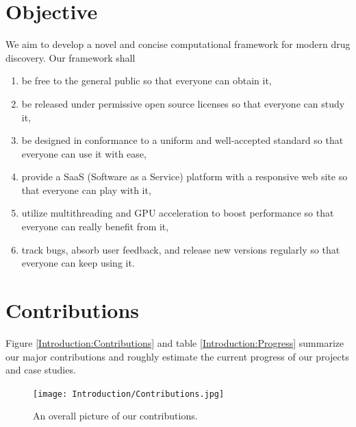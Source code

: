 \section{Objective}

We aim to develop a novel and concise computational framework for modern drug discovery. Our framework shall
\begin{enumerate}
\item be free to the general public so that everyone can obtain it,
\item be released under permissive open source licenses so that everyone can study it,
\item be designed in conformance to a uniform and well-accepted standard so that everyone can use it with ease,
\item provide a SaaS (Software as a Service) platform with a responsive web site so that everyone can play with it,
\item utilize multithreading and GPU acceleration to boost performance so that everyone can really benefit from it,
\item track bugs, absorb user feedback, and release new versions regularly so that everyone can keep using it.
\end{enumerate}

\section{Contributions}

Figure \ref{Introduction:Contributions} and table \ref{Introduction:Progress} summarize our major contributions and roughly estimate the current progress of our projects and case studies.

\begin{figure}
\centering
\texttt{[image: Introduction/Contributions.jpg]}
\caption{An overall picture of our contributions.}
\label{Background:Contributions}
\end{figure}

